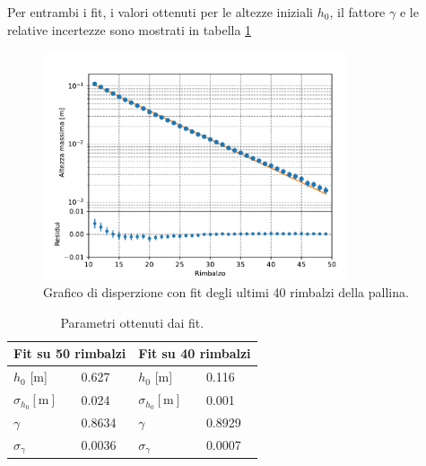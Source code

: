 \documentclass[a4paper]{article}
\begin{document}
    Per entrambi i fit, i valori ottenuti per le altezze iniziali $h_0$,
    il fattore $\gamma$ e le relative incertezze sono mostrati in tabella \ref{tab:fit}
    \begin{figure}[ht!]
        \centering
        \includegraphics[width=0.8\textwidth]{extra/altezza_rimbalzi[10:].pdf}
        \caption{Grafico di disperzione con fit degli ultimi 40 rimbalzi della pallina.}
        \label{fig:altezze_2}
    \end{figure}
    \begin{table}[ht!]
        \centering
        \begin{tabular}{ll|ll}
            \multicolumn{2}{c|}{Fit su 50 rimbalzi} & \multicolumn{2}{c}{Fit su 40 rimbalzi} \\
            \hline
            \hline
            $h_0$ [\si{\m}] & 0.627 & $h_0$ [\si{\m}] & 0.116\\
            $\sigma_{h_0} [\si{\m}]$ & 0.024 & $\sigma_{h_0} [\si{\m}]$ & 0.001\\
            $\gamma$ & 0.8634 & $\gamma$ & 0.8929\\
            $\sigma_{\gamma}$ & 0.0036 & $\sigma_{\gamma}$ & 0.0007
        \end{tabular}
        \caption{Parametri ottenuti dai fit.}
        \label{tab:fit}
    \end{table}
\end{document}
